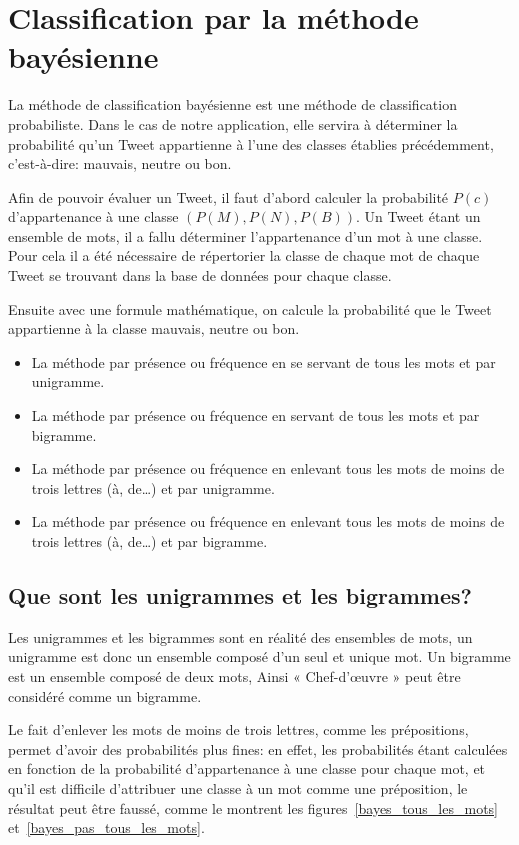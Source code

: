 \documentclass[12pt,a4paper]{report}
\begin{document}
\section{Classification par la méthode bayésienne}
\label{classification_bayesienne}
La méthode de classification bayésienne est une méthode de classification
probabiliste. Dans le cas de notre application, elle servira à déterminer la
probabilité qu'un Tweet appartienne à l'une des classes établies précédemment,
c'est-à-dire: mauvais, neutre ou bon.

Afin de pouvoir évaluer un Tweet, il faut d'abord calculer la probabilité $P(c)$ 
d'appartenance à une classe $(P(M), P(N), P(B))$.
Un Tweet étant un ensemble de mots, il a fallu déterminer l'appartenance d'un
mot à une classe. Pour cela il a été nécessaire de répertorier la classe de
chaque mot de chaque Tweet se trouvant dans la base de données pour chaque
classe.

Ensuite avec une formule mathématique, on calcule la probabilité que le Tweet
appartienne à la classe mauvais, neutre ou bon.

\begin{itemize}
	\item
		La méthode par présence ou fréquence en se servant de tous les mots et
		par unigramme.
	\item
		La méthode par présence ou fréquence en servant de tous les mots et par
		bigramme.
	\item
		La méthode par présence ou fréquence en enlevant tous les mots de moins
		de trois lettres (à, de…) et par unigramme.
	\item
		La méthode par présence ou fréquence en enlevant tous les mots de moins
		de trois lettres (à, de…) et par bigramme.
\end{itemize}

\subsection{Que sont les unigrammes et les bigrammes?}
Les unigrammes et les bigrammes sont en réalité des ensembles de mots, un
unigramme est donc un ensemble composé d'un seul et unique mot. Un bigramme est
un ensemble composé de deux mots, Ainsi « Chef-d'œuvre » peut être considéré
comme un bigramme.

Le fait d'enlever les mots de moins de trois lettres, comme les prépositions,
permet d'avoir des probabilités plus fines: en effet, les probabilités étant
calculées en fonction de la probabilité d'appartenance à une classe pour chaque
mot, et qu'il est difficile d'attribuer une classe à un mot comme une
préposition, le résultat peut être faussé, comme le montrent les
figures~\ref{bayes_tous_les_mots} et~\ref{bayes_pas_tous_les_mots}.
\end{document}
